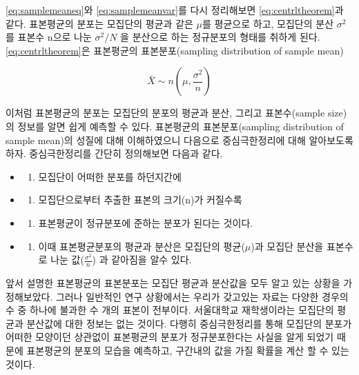 \documentclass[
]{book}
\providecommand{\tightlist}{%
  \setlength{\itemsep}{0pt}\setlength{\parskip}{0pt}}
\begin{document}
\eqref{eq:samplemeaneq}와 \eqref{eq:samplemeanvar}를 다시 정리해보면 \eqref{eq:centrltheorem}과 같다. 표본평균의 분포는 모집단의 평균과 같은 \(μ\)를 평균으로 하고, 모집단의 분산 \(σ^2\) 를 표본수 n으로 나눈 \(σ^2/N\) 을 분산으로 하는 정규분포의 형태를 취하게 된다. \eqref{eq:centrltheorem}은 표본평균의 표본분포(sampling distribution of sample mean)

\begin{equation}
\bar{X} \sim n(\mu,\frac{\sigma^{2}}{n})
\label{eq:centrltheorem}
\end{equation}

이처럼 표본평균의 분포는 모집단의 분포의 평균과 분산, 그리고 표본수(sample size)의 정보를 알면 쉽게 예측할 수 있다. 표본평균의 표본분포(sampling distribution of sample mean)의 성질에 대해 이해하였으니 다음으로 중심극한정리에 대해 알아보도록 하자.
중심극한정리를 간단히 정의해보면 다음과 같다.

\begin{itemize}
\tightlist
\item
  \begin{enumerate}
  \def\labelenumi{(\arabic{enumi})}
  \tightlist
  \item
    모집단이 어떠한 분포를 하던지간에
  \end{enumerate}
\item
  \begin{enumerate}
  \def\labelenumi{(\arabic{enumi})}
  \setcounter{enumi}{1}
  \tightlist
  \item
    모집단으로부터 추출한 표본의 크기(n)가 커질수록
  \end{enumerate}
\item
  \begin{enumerate}
  \def\labelenumi{(\arabic{enumi})}
  \setcounter{enumi}{2}
  \tightlist
  \item
    표본평균이 정규분포에 준하는 분포가 된다는 것이다.
  \end{enumerate}
\item
  \begin{enumerate}
  \def\labelenumi{(\arabic{enumi})}
  \setcounter{enumi}{3}
  \tightlist
  \item
    이때 표본평균분포의 평균과 분산은 모집단의 평균(\(\mu\))과 모집단 분산을 표본수로 나눈 값(\(\frac{\sigma^2}{n}\)) 과 같아짐을 알수 있다.
  \end{enumerate}
\end{itemize}

앞서 설명한 표본평균의 표본분포는 모집단 평균과 분산값을 모두 알고 있는 상황을 가정해보았다. 그러나 일반적인 연구 상황에서는 우리가 갖고있는 자료는 다양한 경우의 수 중 하나에 불과한 수 개의 표본이 전부이다. 서울대학교 재학생이라는 모집단의 평균과 분산값에 대한 정보는 없는 것이다. 다행히 중심극한정리를 통해 모집단의 분포가 어떠한 모양이던 상관없이 표본평균의 분포가 정규분포한다는 사실을 알게 되었기 때문에 표본평균의 분포의 모습을 예측하고, 구간내의 값을 가질 확률을 계산 할 수 있는 것이다.
\end{document}
